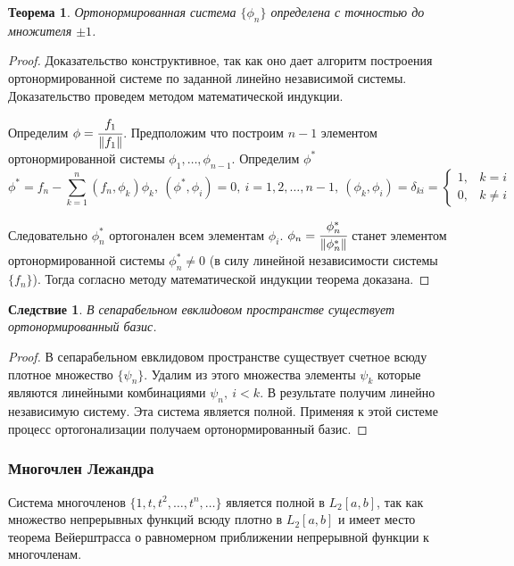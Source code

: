 \documentclass[14pt,a4paper]{extarticle}
\newtheorem{theorem}{Теорема}[section]
\newtheorem{corollary}{Следствие}[theorem]
\theoremstyle{definition}
\theoremstyle{remark}
\newcommand{\sep}{ , \ \allowbreak }
\renewcommand{\[}{\begin{dmath*}[compact]}
\renewcommand{\]}{\end{dmath*}}
\begin{document}
\begin{theorem}
  Ортонормированная система $\{\phi_n\}$ определена с точностью
  до множителя $\pm 1$.
\end{theorem}

\begin{proof}
  Доказательство конструктивное, так как оно дает алгоритм построения
  ортонормированной системе по заданной линейно независимой системы.
  Доказательство проведем методом математической индукции.

  Определим $\phi = \cfrac{f_1}{\Vert f_1 \Vert}$.
  Предположим что построим $n-1$ элементом ортонормированной системы
  $\phi_1, \dots, \phi_{n-1}$. Определим $\phi^*$
  \[\phi^* = f_n - \sum_{k=1}^n (f_n,\phi_k) \phi_k \sep
  {(\phi^* , \phi_i) = 0} \sep {i=1,2,\dots, n-1} \sep
  (\phi_k, \phi_i) = \delta_{ki} \allowbreak
  = \begin{cases} 1, & k=i \\ 0, & k\neq i \end{cases}\]

  Следовательно $\phi_n^*$ ортогонален всем элементам $\phi_i$.
  $\phi_n = \cfrac{\phi_n^*}{\Vert \phi_n^* \Vert}$
  станет элементом ортонормированной системы $\phi_n^* \neq 0$
  (в силу линейной независимости системы $\{f_n\}$).
  Тогда согласно методу математической индукции теорема доказана.
\end{proof}

\begin{corollary}
В сепарабельном евклидовом пространстве существует ортонормированный базис.
\end{corollary}

\begin{proof}
В сепарабельном евклидовом пространстве существует счетное всюду
плотное множество $\{\psi_n\}$.
Удалим из этого множества элементы $\psi_k$ которые являются
линейными комбинациями $\psi_n \sep i<k$. В результате получим
линейно независимую систему.
Эта система является полной.
Применяя к этой системе процесс ортогонализации получаем
ортонормированный базис.
\end{proof}

\subsubsection{Многочлен Лежандра}

Система многочленов $\{1,t,t^2,\dots, t^n,\dots\}$ является полной
в $L_2[a,b]$,
так как множество непрерывных функций всюду плотно в $L_2[a,b]$ и имеет
место теорема Вейерштрасса о равномерном приближении непрерывной
функции к многочленам.
\end{document}
